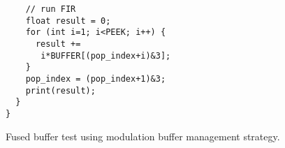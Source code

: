 \begin{figure}[t]
\begin{minipage}{1.5in}
{\begin{verbatim}
    // run FIR                       
    float result = 0;                
    for (int i=1; i<PEEK; i++) {     
      result +=                      
       i*BUFFER[(pop_index+i)&3];    
    }                                
    pop_index = (pop_index+1)&3;     
    print(result);                   
  }                                  
}                                    
\end{verbatim}}
\vspace{-6pt}

\caption{Fused buffer test using modulation buffer management strategy.\protect\label{fig:code-modulation}}
\end{minipage}
\vspace{-12pt}
\end{figure}
